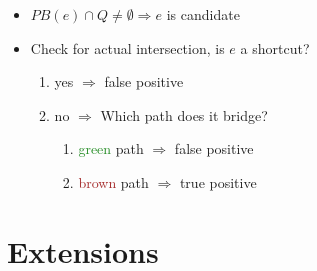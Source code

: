 \documentclass[10pt, t,
aspectratio=1610,%
usenames,
dvipsnames,
]{beamer}
\newcommand{\getAssociatedTrajectories}{GetAssociatedTrajectories\xspace}
\begin{document}
\begin{frame}
\begin{minipage}[t]{0.45\textwidth}
	\end{minipage}
	\hfill
	\begin{minipage}[t]{0.45\textwidth}
		\vspace{0pt}
		\begin{itemize}
			\item<2-> $PB(e) \cap Q \neq \emptyset \Rightarrow e$ is candidate
			\item<3-> Check for actual intersection, is $e$ a shortcut?
			      \begin{enumerate}
				      \item<4-> yes $\Rightarrow$ false positive
				      \item<5-> no $\Rightarrow$ Which path does it bridge?
				            \begin{enumerate}
					            \item<6-> \textcolor{ForestGreen}{green} path $\Rightarrow$ false positive
					            \item<7-> \textcolor{brown}{brown} path $\Rightarrow$ true positive
				            \end{enumerate}
			      \end{enumerate}
		\end{itemize}
	\end{minipage}
\end{frame}

%

\section{Extensions}
\end{document}
